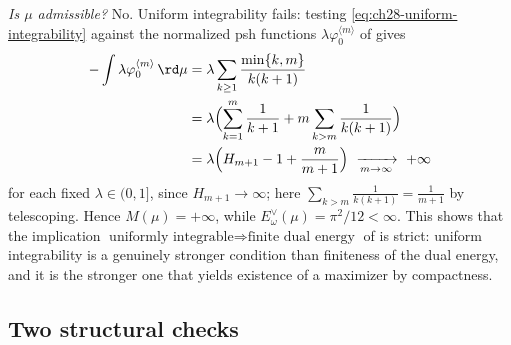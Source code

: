 \begin{example}
\emph{Is $\mu$ admissible?}  No.  Uniform integrability fails:
testing \eqref{eq:ch28-uniform-integrability} against the normalized psh
functions $\lambda\varphi_0^{\langle m\rangle}$ of
 gives
\[
 \begin{aligned}
 -\int\lambda\varphi_0^{\langle m\rangle}\,\rd\mu
 &=\lambda\sum_{k\geq1}\frac{\min\{k,m\}}{k(k+1)}\\
 &=\lambda\Bigl(\sum_{k=1}^{m}\frac1{k+1}
    +m\sum_{k>m}\frac1{k(k+1)}\Bigr)\\
 &=\lambda\Bigl(H_{m+1}-1+\frac{m}{m+1}\Bigr)
 \ \xrightarrow[m\to\infty]{}\ +\infty
 \end{aligned}
\]
for each fixed $\lambda\in(0,1]$, since $H_{m+1}\to\infty$; here
$\sum_{k>m}\frac1{k(k+1)}=\frac1{m+1}$ by telescoping.
Hence $M(\mu)=+\infty$, while $E^\vee_\omega(\mu)=\pi^2/12<\infty$.
This shows that the implication
$\text{uniformly integrable}\Rightarrow\text{finite dual energy}$ of
 is strict: uniform integrability is a genuinely
stronger condition than finiteness of the dual energy, and it is the
stronger one that yields existence of a maximizer by compactness.
\end{example}

\subsection{Two structural checks}
\label{sec:ch28-two-checks}

